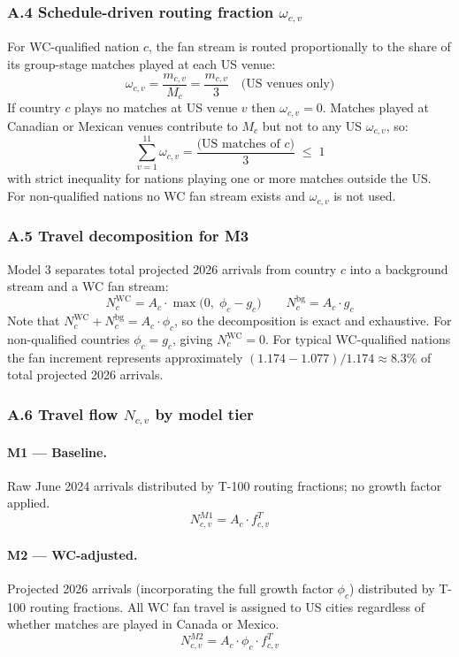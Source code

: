 \documentclass[12pt, a4paper]{article}
\begin{document}
\subsubsection*{A.4 Schedule-driven routing fraction $\omega_{c,v}$}

For WC-qualified nation $c$, the fan stream is routed proportionally
to the share of its group-stage matches played at each US venue:
\[
  \omega_{c,v} = \frac{m_{c,v}}{M_c} = \frac{m_{c,v}}{3}
  \quad \text{(US venues only)}
\]
If country $c$ plays no matches at US venue $v$ then
$\omega_{c,v} = 0$. Matches played at Canadian or Mexican venues
contribute to $M_c$ but not to any US $\omega_{c,v}$, so:
\[
  \sum_{v=1}^{11} \omega_{c,v}
    = \frac{\text{(US matches of }c)}{3} \;\leq\; 1
\]
with strict inequality for nations playing one or more matches
outside the US. For non-qualified nations no WC fan stream exists
and $\omega_{c,v}$ is not used.

\subsubsection*{A.5 Travel decomposition for M3}

Model 3 separates total projected 2026 arrivals from country $c$
into a background stream and a WC fan stream:
\[
  N_c^{\text{WC}} = A_c \cdot \max\!\bigl(0,\;\phi_c - g_c\bigr)
  \qquad
  N_c^{\text{bg}} = A_c \cdot g_c
\]
Note that $N_c^{\text{WC}} + N_c^{\text{bg}} = A_c \cdot \phi_c$,
so the decomposition is exact and exhaustive. For non-qualified
countries $\phi_c = g_c$, giving $N_c^{\text{WC}} = 0$. For
typical WC-qualified nations the fan increment represents
approximately $(1.174 - 1.077)/1.174 \approx 8.3\%$ of total
projected 2026 arrivals.

\subsubsection*{A.6 Travel flow $N_{c,v}$ by model tier}

\paragraph{M1 --- Baseline.}
Raw June 2024 arrivals distributed by T-100 routing fractions;
no growth factor applied.
\[
  \boxed{N_{c,v}^{M1} = A_c \cdot f_{c,v}^{T}}
\]

\paragraph{M2 --- WC-adjusted.}
Projected 2026 arrivals (incorporating the full growth factor
$\phi_c$) distributed by T-100 routing fractions. All WC fan
travel is assigned to US cities regardless of whether matches
are played in Canada or Mexico.
\[
  \boxed{N_{c,v}^{M2} = A_c \cdot \phi_c \cdot f_{c,v}^{T}}
\]
\end{document}
